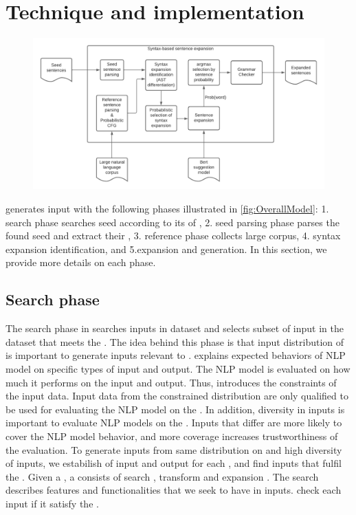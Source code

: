 \section{Technique and implementation}

\begin{figure}
  \centering
  \includegraphics[scale=0.5]{figs/overall.pdf}
  \vspace{-5pt}
  \caption{\OverallModelFigCaption}
  \vspace{-10pt}
\end{figure}

\Model generates input \sents with the following phases illustrated
in \ref{fig:OverallModel}: 1. search phase searches seed \sents
according to its \req of \lc, 2. seed parsing phase parses the
found seed \sents and extract their \cfg, 3. reference phase
collects large corpus, 4. syntax expansion identification, and
5.\sent expansion and generation. In this section, we provide more
details on each phase.

\subsection{Search phase}
The search phase in \Model searches inputs in dataset and selects
subset of input \sents in the dataset that meets the \lc
\req. The idea behind this phase is that input distribution of
\lc is important to generate inputs relevant to \lc. \Lc explains
expected behaviors of NLP model on specific types of input and
output. The NLP model is evaluated on how much it performs on the
input and output. Thus, \lc introduces the constraints of the input
data. Input data from the constrained distribution are only qualified
to be used for evaluating the NLP model on the \lc.  In addition,
diversity in inputs is important to evaluate NLP models on the
\lc. Inputs that differ are more likely to cover the NLP model
behavior, and more coverage increases trustworthiness of the
evaluation. To generate inputs from same distribution on \lc and high
diversity of inputs, we estabilish \reqs of input and output
for each \lc, and find inputs that fulfil the \reqs. Given a
\lc, a \req consists of search \req, transform
\req and expansion \req. The search \req
describes features and functionalities that we seek to have in
inputs. \Model check each input if it satisfy the \req.

